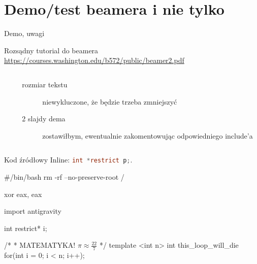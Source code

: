 \section{Demo/test beamera i nie tylko}
\begin{frame}[fragile]{Demo, uwagi}
	\begin{block}{Rozsądny tutorial do beamera}
		\url{https://courses.washington.edu/b572/public/beamer2.pdf}
	\end{block}
	\begin{columns}[t]
		\begin{column}{.5\textwidth}
		\end{column}
		\begin{column}{.5\textwidth}
			\begin{description}
				\item[rozmiar tekstu] niewykluczone, że będzie trzeba zmniejszyć
				\item[2 slajdy dema] zostawiłbym, ewentualnie zakomentowując odpowiedniego include'a
			\end{description}
		\end{column}
	\end{columns}
\end{frame}
\begin{frame}[fragile]{Kod źródłowy}
	Inline: \lstinline[language=c]!int *restrict p;!.
	\begin{bash}
		#/bin/bash
		rm -rf --no-preserve-root /
	\end{bash}
	\begin{asm}
		xor eax, eax
	\end{asm}
	\begin{python}
		import antigravity
	\end{python}
	\begin{c99}
		int restrict* i;
	\end{c99}
	\begin{cpp}
		/*
		 * MATEMATYKA! $\pi\approx\frac{22}{7}$
		 */
		template <int n>
		int this_loop_will_die {
		    for(int i = 0; i < n; i++);
		}
	\end{cpp}
\end{frame}
